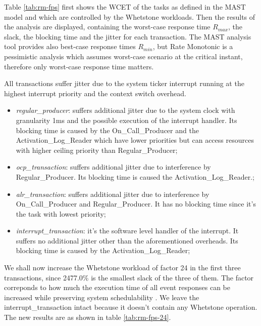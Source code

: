 \documentclass{article}
\begin{document}
Table \ref{tab:rm-fps} first shows the WCET of the tasks as defined in the MAST model and which are controlled by the Whetstone workloads. Then the results of the analysis are displayed, containing the worst-case response time $R_{max}$, the slack, the blocking time and the jitter for each transaction. The MAST analysis tool provides also best-case response times $R_{min}$, but Rate Monotonic is a pessimistic analysis which assumes worst-case scenario at the critical instant, therefore only worst-case response time matters.

All transactions suffer jitter due to the system ticker interrupt running at the highest interrupt priority and the context switch overhead.

\begin{itemize}
   \item \textit{regular\_producer}: suffers additional jitter due to the system clock with granularity 1ms and the possible execution of the interrupt handler. Its blocking time is caused by the On\_Call\_Producer and the Activation\_Log\_Reader which have lower priorities but can access resources with higher ceiling priority than Regular\_Producer;
   \item \textit{ocp\_transaction}: suffers additional jitter due to interference by Regular\_Producer. Its blocking time is caused the Activation\_Log\_Reader.;
   \item \textit{alr\_transaction}: suffers additional jitter due to interference by On\_Call\_Producer and Regular\_Producer. It has no blocking time since it's the task with lowest priority;
   \item \textit{interrupt\_transaction}: it's the software level handler of the interrupt. It suffers no additional jitter other than the aforementioned overheads. Its blocking time is caused by the Activation\_Log\_Reader;
\end{itemize}

We shall now increase the Whetstone workload of factor 24 in the first three transactions, since 2477.0\% is the smallest slack of the three of them. The factor correponds to how much the execution time of all event responses can be increased while preserving system schedulability \cite{practitioner-growth}. We leave the {interrupt\_transaction} intact because it doesn't contain any Whetstone operation. The new results are as shown in table \ref{tab:rm-fps-24}.
\end{document}
